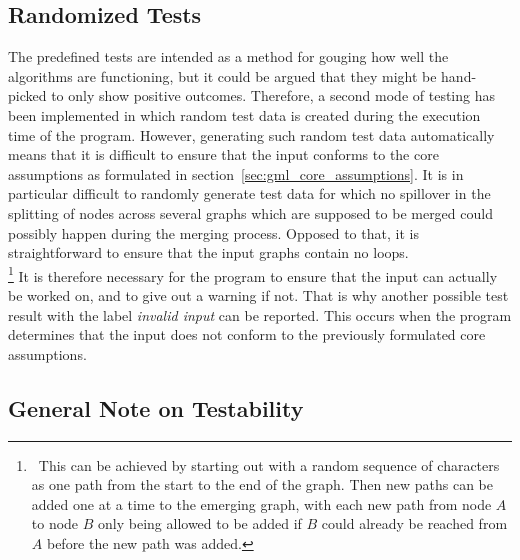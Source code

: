 \documentclass[a4paper,12pt,twoside,BCOR=10mm]{scrbook}
\begin{document}
\subsection{Randomized Tests}

The predefined tests are intended as a method for gouging how well the algorithms 
are functioning, but it could be argued that they might be hand-picked 
to only show positive outcomes. 
Therefore, a second mode of testing has been implemented 
in which random test data is created during the execution time of the program. 
However, generating such random test data automatically means 
that it is difficult to ensure that the input conforms 
to the core assumptions as formulated in section~\ref{sec:gml_core_assumptions}. 
It is in particular difficult to randomly generate test data for which 
no spillover in the splitting of nodes across several graphs which are 
supposed to be merged could possibly happen during the merging process. 
Opposed to that, it is straightforward to ensure that the input graphs 
contain no loops. \\
\footnote{\,\,\,This can be achieved by starting out with a 
random sequence of characters as one path from the start to the end 
of the graph. 
Then new paths can be added one at a time to the emerging 
graph, with each new path from node $ A $ to node $ B $ only being 
allowed to be added if $ B $ could already be reached from $ A $ before 
the new path was added.}
It is therefore necessary for the program to ensure that the 
input can actually be worked on, and to give out a warning if not. 
That is why another possible test result with the label \textit{invalid input} can be reported. 
This occurs when the program determines that the input does not conform 
to the previously formulated core assumptions. 

\subsection{General Note on Testability}
\end{document}
